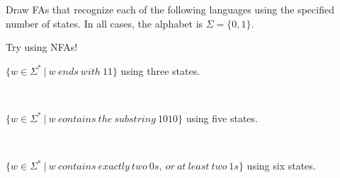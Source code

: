 \documentclass[12pt]{article}
\newenvironment{exercise}[2][Exercise]{\begin{trivlist}
\item[\hskip \labelsep {\bfseries #1}\hskip \labelsep {\bfseries #2.}]}{\end{trivlist}}
\newenvironment{solution}[1][{\color{red} Solution:}]{\begin{trivlist}
\item[\hskip \labelsep {\bfseries #1}\hskip \labelsep {\bfseries}]}{\end{trivlist}}
\begin{document}
 


\newcommand{\studentName}{YOUR NAME HERE} %

\newcommand{\collaborators}{
	with \textit{COLLABORATORS' NAMES HERE}
}


\begin{exercise}{1}
Draw FAs that recognize each of the following languages using the specified number of states.
In all cases, the alphabet is $\Sigma = \{0, 1\}$.

\begin{tip}
    Try using NFAs!
\end{tip}

\begin{enumerate}[(a)]
	\item $\{ w \in \Sigma^* \ | \ w \ ends \ with \ 11 \}$ using three states.
	\begin{solution}\; \\
	
	\end{solution}
	
	\item $\{ w \in \Sigma^* \ | \ w \ contains \ the \ substring \ 1010  \}$ using five states.
	\begin{solution}\; \\

	\end{solution}
	
	\item$\{ w \in \Sigma^* \ | \ w \ contains \ exactly \ two \ 0s, \ or \ at \ least \ two \ 1s \}$ using six states.
	\begin{solution}
 
	\end{solution}
	
\end{enumerate} \; \\
\end{exercise}
\end{document}
